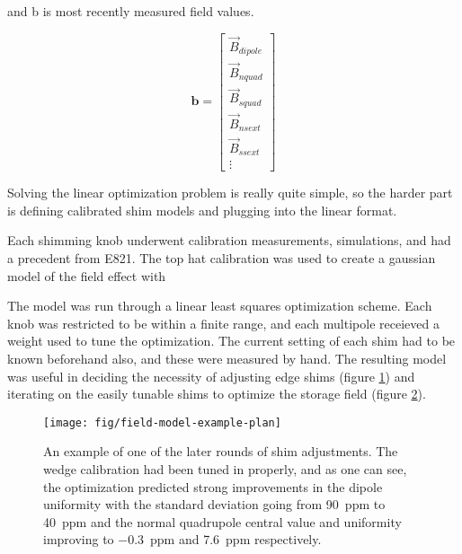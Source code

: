 and b is most recently measured field values.

\[
\mathbf{b} = \begin{bmatrix}
\vec{B}_{dipole} \\
\vec{B}_{nquad}  \\
\vec{B}_{squad}  \\
\vec{B}_{nsext}  \\ 
\vec{B}_{ssext}  \\
\vdots
\end{bmatrix}
\]

Solving the linear optimization problem is really quite simple, so the harder part is defining calibrated shim models and plugging into the linear format.

Each shimming knob underwent calibration measurements, simulations, and had a precedent from E821.  The top hat calibration was used to create a gaussian model of the field effect with


The model was run through a linear least squares optimization scheme.  Each knob was restricted to be within a finite range, and each multipole receieved a weight used to tune the optimization.  The current setting of each shim had to be known beforehand also, and these were measured by hand.  The resulting model was useful in deciding the necessity of adjusting edge shims (figure \ref{fig:field-model-edge-adjustments}) and iterating on the easily tunable shims to optimize the storage field (figure \ref{fig:field-model-example-plan}).

\begin{figure}
\label{fig:field-model-edge-adjustments}
\caption{}
\end{figure}

\begin{figure}
\label{fig:field-model-example-plan}
\texttt{[image: fig/field-model-example-plan]}
\caption{An example of one of the later rounds of shim adjustments.  The wedge calibration had been tuned in properly, and as one can see, the optimization predicted strong improvements in the dipole uniformity with the standard deviation going from \SI{90}{ppm} to \SI{40}{ppm} and the normal quadrupole central value and uniformity improving to \SI{-0.3}{ppm} and \SI{7.6}{ppm} respectively. }
\end{figure}

